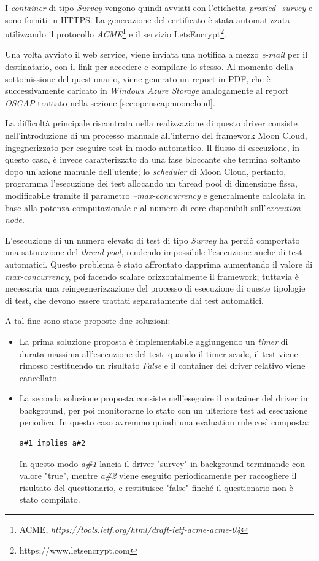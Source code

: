 \documentclass[../main.tex]{subfiles}
\begin{document}
I \textit{container} di tipo \textit{Survey} vengono quindi  avviati con l'etichetta \textit{proxied\_survey} e sono forniti in HTTPS.
La generazione del certificato è stata automatizzata utilizzando il protocollo \textit{ACME}\footnote{ACME,  \textit{https://tools.ietf.org/html/draft-ietf-acme-acme-04}} e il servizio LetsEncrypt\footnote{https://www.letsencrypt.com}.

Una volta avviato il web service, viene inviata una notifica a mezzo \textit{e-mail} per il destinatario, con il link per accedere e compilare lo stesso.
Al momento della sottomissione del questionario, viene generato un report in PDF, che è successivamente caricato in \textit{Windows Azure Storage} analogamente al report \textit{OSCAP} trattato nella sezione \ref{sec:openscapmooncloud}.

La difficoltà principale riscontrata nella realizzazione di questo driver consiste nell'introduzione di un processo manuale all'interno del framework Moon Cloud, ingegnerizzato per eseguire test in modo automatico.
Il flusso di esecuzione, in questo caso, è invece caratterizzato da una fase bloccante che termina soltanto dopo un'azione manuale dell'utente; lo \textit{scheduler} di Moon Cloud, pertanto, programma l'esecuzione dei test allocando un thread pool di dimensione fissa, modificabile tramite il parametro \textit{--max-concurrency} e generalmente calcolata in base alla potenza computazionale e al numero di core disponibili sull'\textit{execution node}.

L'esecuzione di un numero elevato di test di tipo \textit{Survey} ha perciò comportato una saturazione del \textit{thread pool}, rendendo impossibile l'esecuzione anche di test automatici.
Questo problema è stato affrontato dapprima aumentando il valore di \textit{max-concurrency}, poi facendo scalare orizzontalmente il framework; tuttavia è necessaria una reingegnerizzazione del processo di esecuzione di queste tipologie di test, che devono essere trattati separatamente dai test automatici.

A tal fine sono state proposte due soluzioni:
\begin{itemize}
    \item La prima soluzione proposta è implementabile aggiungendo un \textit{timer} di durata massima all'esecuzione del test: quando il timer scade, il test viene rimosso restituendo un risultato \textit{False} e il container del driver relativo viene cancellato.
\item La seconda soluzione proposta consiste nell'eseguire il container del driver in background, per poi monitorarne lo stato con un ulteriore test ad esecuzione periodica. 
In questo caso avremmo quindi una evaluation rule così composta:
\begin{Verbatim}[frame=single]
a#1 implies a#2
\end{Verbatim}
In questo modo \textit{a\#1} lancia il driver "survey" in background terminande con valore "true", mentre \textit{a\#2} viene eseguito periodicamente per raccogliere il risultato del questionario, e restituisce "false" finché il questionario non è stato compilato.
\end{itemize}
\end{document}
